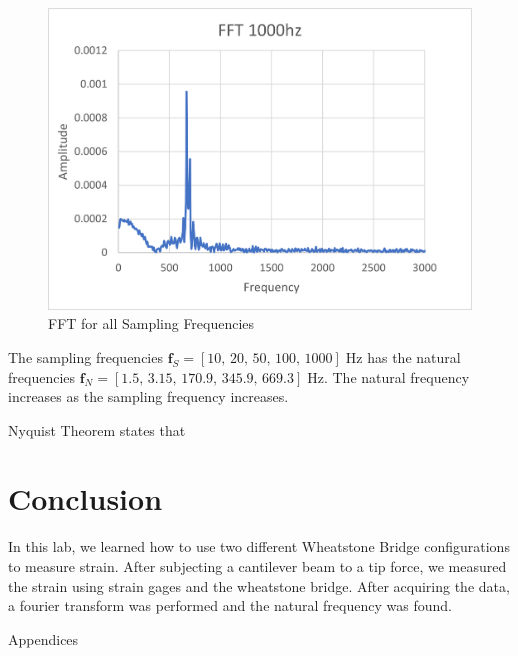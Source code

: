 \documentclass{article}
\begin{document}
\begin{figure}[H]
\begin{minipage}{.5\textwidth}
      \includegraphics[width=.95\linewidth]{lab5images/FFT1000hz.png}
      \caption{FFT for all Sampling Frequencies}
      \label{fig:fft1000hz}
    \end{minipage}
    \label{fig:ffts}
\end{figure}
    
The sampling frequencies \(\textbf{f}_{S} = \left[10,\, 20,\, 50,\, 100,\, 1000\right]\; \text{Hz}\) has the natural frequencies \(\textbf{f}_{N} = \left[1.5,\, 3.15,\, 170.9,\, 345.9,\, 669.3\right]\; \text{Hz}\).  The natural frequency increases as the sampling frequency increases.
\vspace{5mm}

Nyquist Theorem states that 

\section{Conclusion}
In this lab, we learned how to use two different Wheatstone Bridge configurations to measure strain.  After subjecting a cantilever beam to a tip force, we measured the strain using strain gages and the wheatstone bridge.  After acquiring the data, a fourier transform was performed and the natural frequency was found.





\newpage
\thispagestyle{empty}  %
\begin{center}
	\vspace*{\fill}
	{\Huge Appendices}
	\vspace*{\fill}
\end{center}
\end{document}
